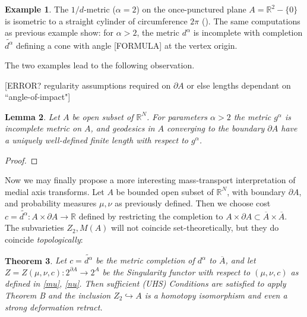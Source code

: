 \documentclass[12pt]{article}
\newtheorem{thm}{Theorem}
\newtheorem{lem}[thm]{Lemma}
\theoremstyle{definition}
\newtheorem{exx}[thm]{Example}
\theoremstyle{remark}
\newcommand{\bR}{\mathbb{R}}
\newcommand{\del}{\partial}
\begin{document}
\begin{exx}
The $1/d$-metric ($\alpha=2$) on the once-punctured plane $A=\bR^2-\{0\}$ is isometric to a straight cylinder of circumference $2\pi$ (\cite[Ex.2.2.6]{hubbard}). The same computations as previous example show: for $\alpha>2$, the metric $d^\alpha$ is incomplete with completion $\tilde{d^\alpha}$ defining a cone with angle [FORMULA] at the vertex origin. 
\end{exx}


The two examples lead to the following observation.

[ERROR? regularity assumptions required on $\del A$ or else lengths dependant on ``angle-of-impact"]
\begin{lem}
Let $A$ be open subset of $\bR^N$. For parameters $\alpha>2$ the metric $g^\alpha$ is incomplete metric on $A$, and geodesics in $A$ converging to the boundary $\del A$ have a uniquely well-defined finite length with respect to $g^\alpha$.  
\end{lem}
\begin{proof}


\end{proof}

Now we may finally propose a more interesting mass-transport interpretation of medial axis transforms. Let $A$ be bounded open subset of $\bR^N$, with boundary $\del A$, and probability measures $\mu, \nu$ as previously defined. Then we choose cost $c=\tilde{d^\alpha}: A\times \del A \to \bR$ defined by restricting the completion to $A\times \del A \subset \overline{A} \times \overline{A}$. The subvarieties $Z_2, M(A)$ will not coincide set-theoretically, but they do coincide \emph{topologically}: 

\begin{thm}
Let $c=\tilde{d^\alpha}$ be the metric completion of $d^\alpha$ to $\overline{A}$, and let $Z=Z(\mu, \nu, c): 2^{\del A} \to 2^A$ be the Singularity functor with respect to $(\mu, \nu, c)$ as defined in \eqref{mu}, \eqref{nu}. Then sufficient (UHS) Conditions are satisfied to apply Theorem B and the inclusion $Z_2 \hookrightarrow A$ is a homotopy isomorphism and even a strong deformation retract.
\end{thm}



\end{document}
